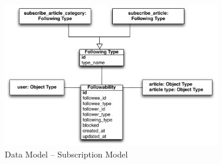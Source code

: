 \begin{figure}[H]
\centering
\includegraphics[width=0.85\textwidth]{img/user2article.pdf}
\caption{Data Model -- Subscription Model}
\label{pic:data:user2article}
\end{figure}

